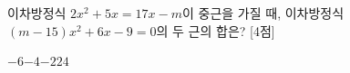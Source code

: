 이차방정식 $2x^2+5x=17x-m$이 중근을 가질 때, 이차방정식 $(m-15)x^2+6x-9=0$의 두 근의 합은?  \mbox{[4점]}
\begin{choices32}{$-6$}{$-4$}{$-2$}{$2$}{$4$}\end{choices32}

